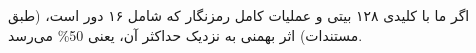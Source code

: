 \documentclass[dvipsnames, svgnames, x11names]{article}
\begin{document}
اگر ما با کلیدی ۱۲۸ بیتی و عملیات کامل رمزنگار
که شامل ۱۶ دور است، (طبق مستندات) اثر بهمنی به نزدیک حداکثر آن، یعنی 50\% می‌رسد.


\begin{figure}[b]
\begin{center}
\end{center}
\end{figure}
\end{document}
